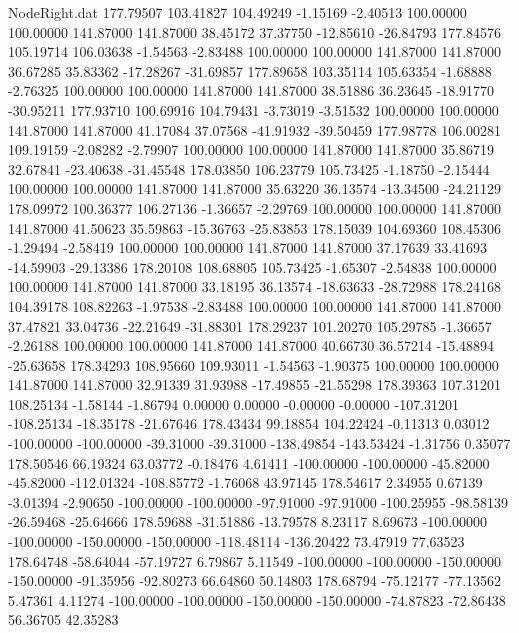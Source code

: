 \begin{filecontents}{NodeRight.dat}
 177.79507  103.41827  104.49249    -1.15169   -2.40513  100.00000  100.00000  141.87000  141.87000   38.45172   37.37750  -12.85610  -26.84793
 177.84576  105.19714  106.03638    -1.54563   -2.83488  100.00000  100.00000  141.87000  141.87000   36.67285   35.83362  -17.28267  -31.69857
 177.89658  103.35114  105.63354    -1.68888   -2.76325  100.00000  100.00000  141.87000  141.87000   38.51886   36.23645  -18.91770  -30.95211
 177.93710  100.69916  104.79431    -3.73019   -3.51532  100.00000  100.00000  141.87000  141.87000   41.17084   37.07568  -41.91932  -39.50459
 177.98778  106.00281  109.19159    -2.08282   -2.79907  100.00000  100.00000  141.87000  141.87000   35.86719   32.67841  -23.40638  -31.45548
 178.03850  106.23779  105.73425    -1.18750   -2.15444  100.00000  100.00000  141.87000  141.87000   35.63220   36.13574  -13.34500  -24.21129
 178.09972  100.36377  106.27136    -1.36657   -2.29769  100.00000  100.00000  141.87000  141.87000   41.50623   35.59863  -15.36763  -25.83853
 178.15039  104.69360  108.45306    -1.29494   -2.58419  100.00000  100.00000  141.87000  141.87000   37.17639   33.41693  -14.59903  -29.13386
 178.20108  108.68805  105.73425    -1.65307   -2.54838  100.00000  100.00000  141.87000  141.87000   33.18195   36.13574  -18.63633  -28.72988
 178.24168  104.39178  108.82263    -1.97538   -2.83488  100.00000  100.00000  141.87000  141.87000   37.47821   33.04736  -22.21649  -31.88301
 178.29237  101.20270  105.29785    -1.36657   -2.26188  100.00000  100.00000  141.87000  141.87000   40.66730   36.57214  -15.48894  -25.63658
 178.34293  108.95660  109.93011    -1.54563   -1.90375  100.00000  100.00000  141.87000  141.87000   32.91339   31.93988  -17.49855  -21.55298
 178.39363  107.31201  108.25134    -1.58144   -1.86794    0.00000    0.00000   -0.00000   -0.00000 -107.31201 -108.25134  -18.35178  -21.67646
 178.43434   99.18854  104.22424    -0.11313    0.03012 -100.00000 -100.00000  -39.31000  -39.31000 -138.49854 -143.53424   -1.31756    0.35077
 178.50546   66.19324   63.03772    -0.18476    4.61411 -100.00000 -100.00000  -45.82000  -45.82000 -112.01324 -108.85772   -1.76068   43.97145
 178.54617    2.34955    0.67139    -3.01394   -2.90650 -100.00000 -100.00000  -97.91000  -97.91000 -100.25955  -98.58139  -26.59468  -25.64666
 178.59688  -31.51886  -13.79578     8.23117    8.69673 -100.00000 -100.00000 -150.00000 -150.00000 -118.48114 -136.20422   73.47919   77.63523
 178.64748  -58.64044  -57.19727     6.79867    5.11549 -100.00000 -100.00000 -150.00000 -150.00000  -91.35956  -92.80273   66.64860   50.14803
 178.68794  -75.12177  -77.13562     5.47361    4.11274 -100.00000 -100.00000 -150.00000 -150.00000  -74.87823  -72.86438   56.36705   42.35283

\end{filecontents}
